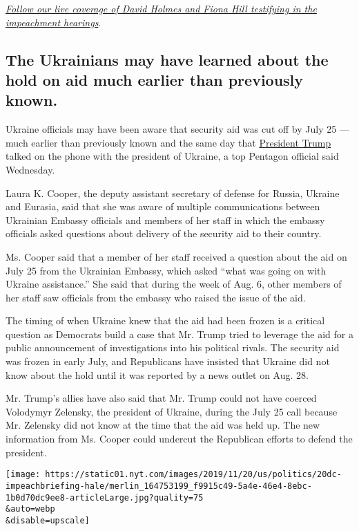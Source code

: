 \href{https://www.nytimes.com/2019/11/21/us/politics/impeachment-hearing.html}{\emph{Follow
our live coverage of David Holmes and Fiona Hill testifying in the
impeachment hearings}}.

\hypertarget{the-ukrainians-may-have-learned-about-the-hold-on-aid-much-earlier-than-previously-known}{%
\subsection{The Ukrainians may have learned about the hold on aid much
earlier than previously
known.}\label{the-ukrainians-may-have-learned-about-the-hold-on-aid-much-earlier-than-previously-known}}

Ukraine officials may have been aware that security aid was cut off by
July 25 --- much earlier than previously known and the same day that
\href{https://www.nytimes.com/2019/11/21/podcasts/the-daily/impeachment-sondland.html}{President
Trump} talked on the phone with the president of Ukraine, a top Pentagon
official said Wednesday.

Laura K. Cooper, the deputy assistant secretary of defense for Russia,
Ukraine and Eurasia, said that she was aware of multiple communications
between Ukrainian Embassy officials and members of her staff in which
the embassy officials asked questions about delivery of the security aid
to their country.

Ms. Cooper said that a member of her staff received a question about the
aid on July 25 from the Ukrainian Embassy, which asked ``what was going
on with Ukraine assistance.'' She said that during the week of Aug. 6,
other members of her staff saw officials from the embassy who raised the
issue of the aid.

The timing of when Ukraine knew that the aid had been frozen is a
critical question as Democrats build a case that Mr. Trump tried to
leverage the aid for a public announcement of investigations into his
political rivals. The security aid was frozen in early July, and
Republicans have insisted that Ukraine did not know about the hold until
it was reported by a news outlet on Aug. 28.

Mr. Trump's allies have also said that Mr. Trump could not have coerced
Volodymyr Zelensky, the president of Ukraine, during the July 25 call
because Mr. Zelensky did not know at the time that the aid was held up.
The new information from Ms. Cooper could undercut the Republican
efforts to defend the president.

\texttt{[image: https://static01.nyt.com/images/2019/11/20/us/politics/20dc-impeachbriefing-hale/merlin\_164753199\_f9915c49-5a4e-46e4-8ebc-1b0d70dc9ee8-articleLarge.jpg?quality=75\\\&auto=webp\\\&disable=upscale]}

